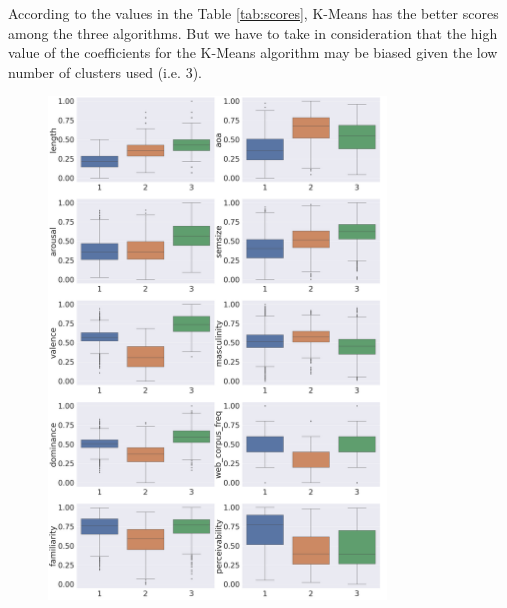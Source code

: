 \documentclass[a4paper,11pt,dvipsnames]{article}
\begin{document}
According to the values in the Table \ref{tab:scores}, K-Means has the better scores among the three algorithms. But we have to take in consideration that the high value of the coefficients for the K-Means algorithm may be biased given the low number of clusters used (i.e. 3).
\begin{figure}[h]
    \begin{minipage}{0.47\linewidth}
            \centering
            \includegraphics[width=0.8\textwidth]{kmeans-box2.png}
            \label{fig:boxclukmeans}
    \end{minipage}
    \hfil
    \begin{minipage}{0.47\linewidth}
            \centering

\end{minipage}
\end{figure}
\end{document}
